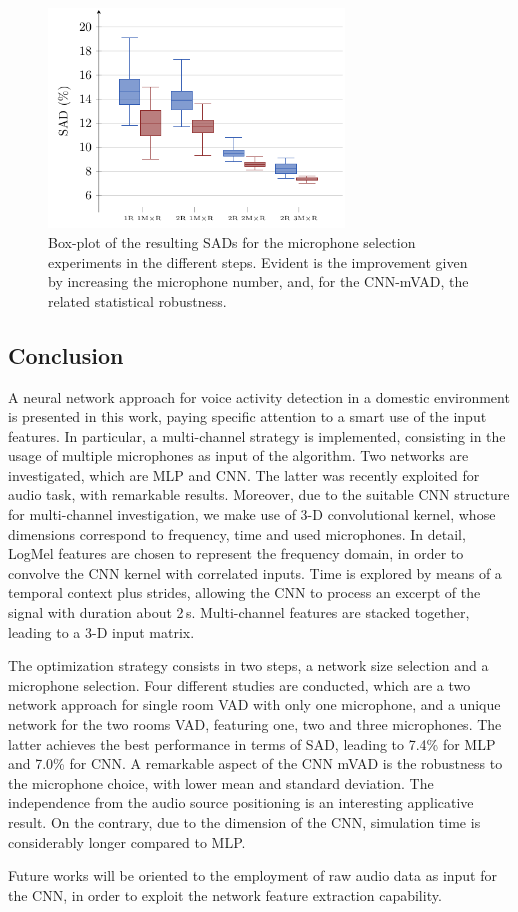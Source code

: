 \begin{figure}[t]
	\centering
	\includegraphics[width=0.7\textwidth]{img/pgfsources/graph1/graph1}
	\caption[Multiroom VAD - Results]{Box-plot of the resulting SADs for the microphone selection experiments in the different steps. Evident is the improvement given by increasing the microphone number, and, for the CNN-mVAD, the related statistical robustness.}
	\label{fig:variance}
\end{figure}


\subsection{Conclusion}

A neural network approach for voice activity detection in a domestic environment is presented in this work, paying specific attention to a smart use of the input features. In particular, a multi-channel strategy is implemented, consisting in the usage of multiple microphones as input of the algorithm. Two networks are investigated, which are MLP and CNN. The latter was recently exploited for audio task, with remarkable results. Moreover, due to the suitable CNN structure for multi-channel investigation, we make use of 3-D convolutional kernel, whose dimensions correspond to frequency, time and used microphones. In detail, LogMel features are chosen to represent the frequency domain, in order to convolve the CNN kernel with correlated inputs. Time is explored by means of a temporal context plus strides, allowing the CNN  to process an excerpt of the signal with duration about 2\,s. Multi-channel features are stacked together, leading to a 3-D input matrix.

The optimization strategy consists in two steps, a network size selection and a microphone selection. Four different studies are conducted, which are a two network approach for single room VAD with only one microphone, and a unique network for the two rooms VAD, featuring  one, two and three microphones. The latter achieves the best performance in terms of SAD, leading to 7.4\% for MLP and 7.0\% for CNN. A remarkable aspect of the CNN mVAD is the robustness to the microphone choice, with lower mean and standard deviation. The independence from the audio source positioning is an interesting applicative result. On the contrary, due to the dimension of the CNN, simulation time is considerably longer compared to MLP.

Future works will be oriented to the employment of raw audio data as input for the CNN, in order to exploit the network feature extraction capability.